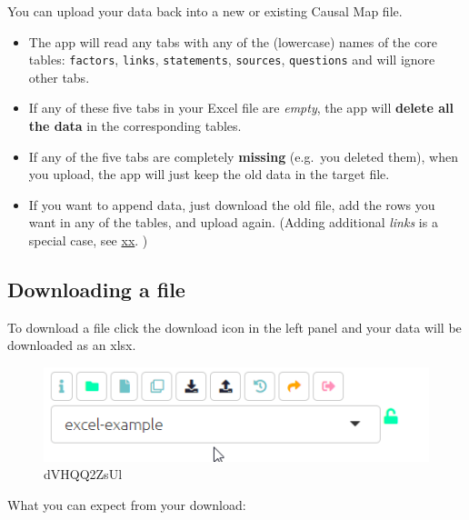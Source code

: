 \documentclass[
]{book}
\providecommand{\tightlist}{%
  \setlength{\itemsep}{0pt}\setlength{\parskip}{0pt}}
\begin{document}
You can upload your data back into a new or existing Causal Map file.

\begin{itemize}
\tightlist
\item
  The app will read any tabs with any of the (lowercase) names of the core tables: \texttt{factors}, \texttt{links}, \texttt{statements}, \texttt{sources}, \texttt{questions} and will ignore other tabs.
\item
  If any of these five tabs in your Excel file are \emph{empty}, the app will \textbf{delete all the data} in the corresponding tables.
\item
  If any of the five tabs are completely \textbf{missing} (e.g.~you deleted them), when you upload, the app will just keep the old data in the target file.
\item
  If you want to append data, just download the old file, add the rows you want in any of the tables, and upload again. (Adding additional \emph{links} is a special case, see \href{}{xx}. )
\end{itemize}

\hypertarget{downloading-a-file}{%
\subsection{Downloading a file}\label{downloading-a-file}}

To download a file click the download icon in the left panel and your data will be downloaded as an xlsx.

\begin{figure}
\centering
\includegraphics[width=6.77083in,height=\textheight]{_assets/dVHQQ2ZsUl.gif}
\caption{dVHQQ2ZsUl}
\end{figure}

What you can expect from your download:
\end{document}
